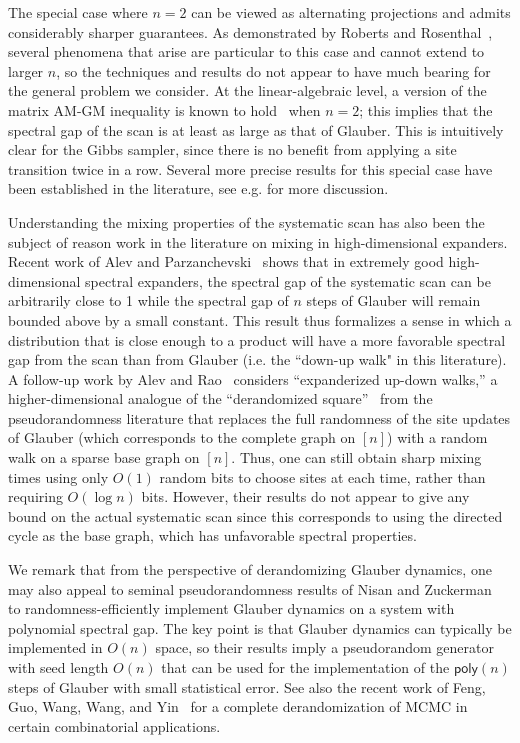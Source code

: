 \documentclass[11pt]{article}
\begin{document}
The special case where $n=2$ can be viewed as alternating projections and admits considerably sharper guarantees. As demonstrated by Roberts and Rosenthal~\cite{roberts2015surprising}, several phenomena that arise are particular to this case and cannot extend to larger $n$, so the techniques and results do not appear to have much bearing for the general problem we consider. At the linear-algebraic level, a version of the matrix AM-GM inequality is known to hold~\cite{BHATIA2000203} when $n=2$; this implies that the spectral gap of the scan is at least as large as that of Glauber. This is intuitively clear for the Gibbs sampler, since there is no benefit from applying a site transition twice in a row. Several more precise results for this special case have been established in the literature, see e.g. \cite{diaconis2010stochastic,andrieu,DBLP:conf/aistats/0001KZ18,qin} for more discussion.

Understanding the mixing properties of the systematic scan has also been the subject of reason work in the literature on mixing in high-dimensional expanders. Recent work of Alev and Parzanchevski~\cite{alev_1} shows that in extremely good high-dimensional spectral expanders, the spectral gap of the systematic scan can be arbitrarily close to 1 while the spectral gap of $n$ steps of Glauber will remain bounded above by a small constant. This result thus formalizes a sense in which a distribution that is close enough to a product will have a more favorable spectral gap from the scan than from Glauber (i.e. the ``down-up walk" in this literature). A follow-up work by Alev and Rao~\cite{alev_rao} considers ``expanderized up-down walks,'' a higher-dimensional analogue of the ``derandomized square''~\cite{DBLP:conf/approx/RozenmanV05} from the pseudorandomness literature that replaces the full randomness of the site updates of Glauber (which corresponds to the complete graph on $[n]$) with a random walk on a sparse base graph on $[n]$. Thus, one can still obtain sharp mixing times using only $O(1)$ random bits to choose sites at each time, rather than requiring $O(\log n)$ bits.  However, their results do not appear to give any bound on the actual systematic scan since this corresponds to using the directed cycle as the base graph, which has unfavorable spectral properties. 

We remark that from the perspective of derandomizing Glauber dynamics, one may also appeal to seminal pseudorandomness results of Nisan and Zuckerman~\cite{DBLP:journals/jcss/NisanZ96} to randomness-efficiently implement Glauber dynamics on a system with polynomial spectral gap. The key point is that Glauber dynamics can typically be implemented in $O(n)$ space, so their results imply a pseudorandom generator with seed length $O(n)$ that can be used for the implementation of the $\mathsf{poly}(n)$ steps of Glauber with small statistical error. See also the recent work of Feng, Guo, Wang, Wang, and Yin~\cite{derandomizingmcmc} for a complete derandomization of MCMC in certain combinatorial applications.
\end{document}
